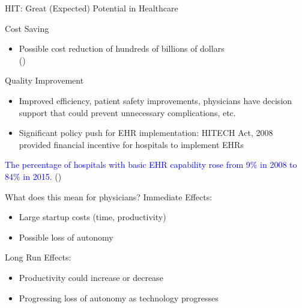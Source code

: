 \documentclass[10pt]{beamer}
\begin{document}
\begin{frame}[fragile]{HIT: Great (Expected) Potential in Healthcare}
\begin{alertblock}{Cost Saving}
\begin{itemize}
    \item Possible cost reduction of hundreds of billions of dollars \\ (\cite{hillestad2005})
\end{itemize}
\end{alertblock}

\begin{alertblock}{Quality Improvement}
\begin{itemize}
    \item Improved efficiency, patient safety improvements, physicians have decision support that could prevent unnecessary complications, etc.
    \item Significant policy push for EHR implementation: HITECH Act, 2008 provided financial incentive for hospitals to implement EHRs \nocite{hitech}
\end{itemize}
\end{alertblock}

\textcolor{blue}{The percentage of hospitals with basic EHR capability rose from 9$\%$ in 2008 to 84$\%$ in 2015.} (\cite{stats})

\end{frame}

\begin{frame}[fragile]{What does this mean for physicians?}
Immediate Effects:
\begin{itemize}
    \item Large startup costs (time, productivity)
    \item Possible loss of autonomy
\end{itemize}

Long Run Effects:
\begin{itemize}
    \item Productivity could increase or decrease
    \item Progressing loss of autonomy as technology progresses
\end{itemize}

\end{frame}
\end{document}
